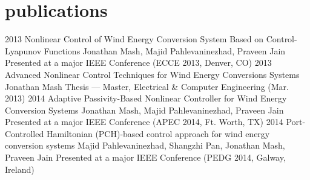 \section{publications}

\begin{entrylist}
\entry
{2013}
{Nonlinear Control of Wind Energy Conversion System Based on Control-Lyapunov Functions}
{Jonathan Mash, Majid Pahlevaninezhad, Praveen Jain}
{Presented at a major IEEE Conference (ECCE 2013, Denver, CO)}
\entry
{2013}
{Advanced Nonlinear Control Techniques for Wind Energy Conversions Systems}
{Jonathan Mash}
{Thesis — Master, Electrical \& Computer Engineering (Mar. 2013)}
\entry
{2014}
{Adaptive Passivity-Based Nonlinear Controller for Wind Energy Conversion Systems}
{Jonathan Mash, Majid Pahlevaninezhad, Praveen Jain}
{Presented at a major IEEE Conference (APEC 2014, Ft. Worth, TX)}
\entry
{2014}
{Port-Controlled Hamiltonian (PCH)-based control approach for wind energy conversion systems}
{Majid Pahlevaninezhad, Shangzhi Pan, Jonathan Mash, Praveen Jain}
{Presented at a major IEEE Conference (PEDG 2014, Galway, Ireland)}

\end{entrylist}
